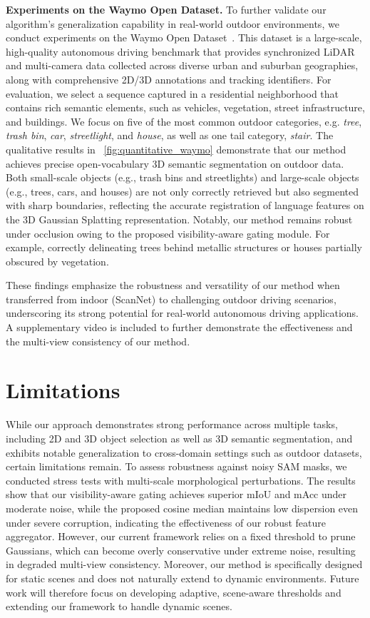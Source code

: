 \textbf{Experiments on the Waymo Open Dataset.} To further validate our algorithm’s generalization capability in real-world outdoor environments, we conduct experiments on the Waymo Open Dataset~\cite{Sun_2020_CVPR}. This dataset is a large-scale, high-quality autonomous driving benchmark that provides synchronized LiDAR and multi-camera data collected across diverse urban and suburban geographies, along with comprehensive 2D/3D annotations and tracking identifiers.
For evaluation, we select a sequence captured in a residential neighborhood that contains rich semantic elements, such as vehicles, vegetation, street infrastructure, and buildings. We focus on five of the most common outdoor categories, e.g. \textit{tree}, \textit{trash bin}, \textit{car}, \textit{streetlight}, and \textit{house}, as well as one tail category, \textit{stair}. The qualitative results in \figureautorefname~\ref{fig:quantitative_waymo} demonstrate that our method achieves precise open-vocabulary 3D semantic segmentation on outdoor data. Both small-scale objects (e.g., trash bins and streetlights) and large-scale objects (e.g., trees, cars, and houses) are not only correctly retrieved but also segmented with sharp boundaries, reflecting the accurate registration of language features on the 3D Gaussian Splatting representation. Notably, our method remains robust under occlusion owing to the proposed visibility-aware gating module. For example, correctly delineating trees behind metallic structures or houses partially obscured by vegetation.

These findings emphasize the robustness and versatility of our method when transferred from indoor (ScanNet) to challenging outdoor driving scenarios, underscoring its strong potential for real-world autonomous driving applications. A supplementary video is included to further demonstrate the effectiveness and the multi-view consistency of our method. 

\section{Limitations}
\label{subsec:limt}

While our approach demonstrates strong performance across multiple tasks, including 2D and 3D object selection as well as 3D semantic segmentation, and exhibits notable generalization to cross-domain settings such as outdoor datasets, certain limitations remain. To assess robustness against noisy SAM masks, we conducted stress tests with multi-scale morphological perturbations. The results show that our visibility-aware gating achieves superior mIoU and mAcc under moderate noise, while the proposed cosine median maintains low dispersion even under severe corruption, indicating the effectiveness of our robust feature aggregator. However, our current framework relies on a fixed threshold to prune Gaussians, which can become overly conservative under extreme noise, resulting in degraded multi-view consistency. Moreover, our method is specifically designed for static scenes and does not naturally extend to dynamic environments. Future work will therefore focus on developing adaptive, scene-aware thresholds and extending our framework to handle dynamic scenes.
